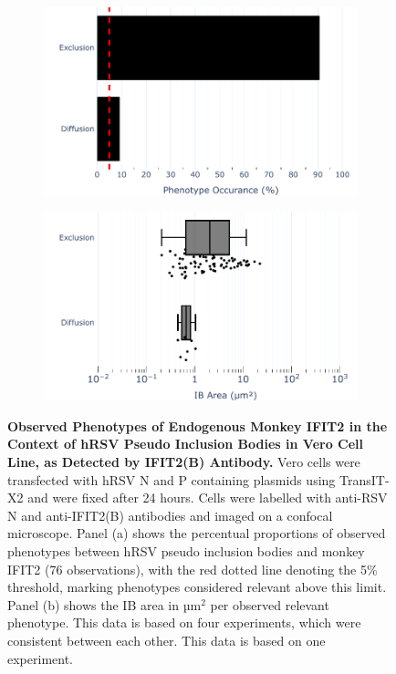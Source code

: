 \begin{figure}
    \begin{subfigure}{0.495\textwidth}
        \caption{}
        \includegraphics[width=1\linewidth]{09. Chapter 4/Figs/01. pIB/03. IFIT2/03. IFIT2B/04. bar_i2b_vero_hnhp.pdf} 
    \end{subfigure}
    \begin{subfigure}{0.495\textwidth}
        \caption{}
        \includegraphics[width=1\linewidth]{09. Chapter 4/Figs/01. pIB/03. IFIT2/03. IFIT2B/05. box_i2b_vero_hnhp.pdf}
    \end{subfigure}
    \caption[Observed Phenotypes of Endogenous Monkey IFIT2 in the Context of hRSV Pseudo Inclusion Bodies in Vero Cell Line, as Detected by IFIT2(B) Antibody.]{\textbf{Observed Phenotypes of Endogenous Monkey IFIT2 in the Context of hRSV Pseudo Inclusion Bodies in Vero Cell Line, as Detected by IFIT2(B) Antibody.} Vero cells were transfected with hRSV N and P containing plasmids using TransIT-X2 and were fixed after 24 hours. Cells were labelled with anti-RSV N and anti-IFIT2(B) antibodies and imaged on a confocal microscope. Panel (a) shows the percentual proportions of observed phenotypes between hRSV pseudo inclusion bodies and monkey IFIT2 (76 observations), with the red dotted line denoting the 5\% threshold, marking phenotypes considered relevant above this limit. Panel (b) shows the IB area in \(\mbox{µm}^2\) per observed relevant phenotype. This data is based on four experiments, which were consistent between each other.
This data is based on one experiment.}
    \label{fig:Observed Phenotypes of Endogenous Monkey IFIT2 in the Context of hRSV Pseudo Inclusion Bodies in Vero Cell Line, as Detected by IFIT2(B) Antibody}
\end{figure}

